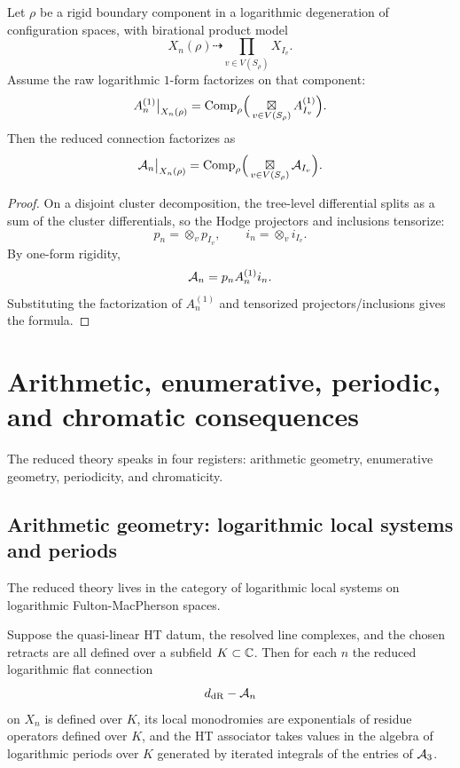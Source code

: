 \begin{theorem}\label{thm:reduced-boundary-factorization}
Let $\rho$ be a rigid boundary component in a logarithmic degeneration of configuration spaces, with birational product model
\[
 X_n(\rho) \dashrightarrow \prod_{v\in V(S_\rho)} X_{I_v}.
\]
Assume the raw logarithmic $1$-form factorizes on that component:
\[
 A_n^{(1)}\big|_{X_n(\rho)}
 =
 \mathrm{Comp}_\rho\Big(\mathop{\boxtimes}\displaylimits_{v\in V(S_\rho)} A_{I_v}^{(1)}\Big).
\]
Then the reduced connection factorizes as
\[
 \mathcal A_n\big|_{X_n(\rho)}
 =
 \mathrm{Comp}_\rho\Big(\mathop{\boxtimes}\displaylimits_{v\in V(S_\rho)} \mathcal A_{I_v}\Big).
\]
\end{theorem}

\begin{proof}
On a disjoint cluster decomposition, the tree-level differential splits as a sum of the cluster differentials, so the Hodge projectors and inclusions tensorize:
\[
 p_n=\otimes_v p_{I_v},
 \qquad
 i_n=\otimes_v i_{I_v}.
\]
By one-form rigidity,
\[
 \mathcal A_n=p_nA_n^{(1)}i_n.
\]
Substituting the factorization of $A_n^{(1)}$ and tensorized projectors/inclusions gives the formula.
\end{proof}

\section{Arithmetic, enumerative, periodic, and chromatic consequences}\label{sec:consequences}

The reduced theory speaks in four registers: arithmetic geometry, enumerative geometry, periodicity, and chromaticity.

\subsection{Arithmetic geometry: logarithmic local systems and periods}
The reduced theory lives in the category of logarithmic local systems on logarithmic Fulton-MacPherson spaces.

\begin{proposition}\label{prop:arithmetic-form}
Suppose the quasi-linear HT datum, the resolved line complexes, and the chosen retracts are all defined over a subfield $K\subset\mathbb C$. Then for each $n$ the reduced logarithmic flat connection
\[
 d_{\mathrm{dR}}-\mathcal A_n
\]
on $X_n$ is defined over $K$, its local monodromies are exponentials of residue operators defined over $K$, and the HT associator takes values in the algebra of logarithmic periods over $K$ generated by iterated integrals of the entries of $\mathcal A_3$.
\end{proposition}

